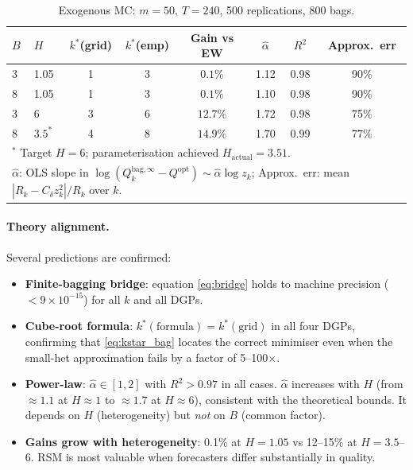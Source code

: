 \documentclass[12pt,a4paper]{article}
\begin{document}
\begin{table}[h]
\centering
\caption{Exogenous MC: $m=50$, $T=240$, 500 replications, 800 bags.}
\label{tab:exo_main}
\begin{tabular}{llcccccc}
\toprule
$B$ & $H$ & $k^*$(grid) & $k^*$(emp) & Gain vs EW
    & $\hat\alpha$ & $R^2$ & Approx.\ err \\
\midrule
3 & 1.05 & 1 & 3 & $0.1\%$ & 1.12 & 0.98 & 90\% \\
8 & 1.05 & 1 & 3 & $0.1\%$ & 1.10 & 0.98 & 90\% \\
3 & 6    & 3 & 6 & $12.7\%$ & 1.72 & 0.98 & 75\% \\
8 & $3.5^*$ & 4 & 8 & $14.9\%$ & 1.70 & 0.99 & 77\% \\
\bottomrule
\multicolumn{8}{l}{\footnotesize $^*$ Target $H=6$; parameterisation achieved $H_{\mathrm{actual}}=3.51$.}\\
\multicolumn{8}{l}{\footnotesize $\hat\alpha$: OLS slope in $\log(Q_k^{\mathrm{bag},\infty}-Q^{\mathrm{opt}}) \sim \hat\alpha\log z_k$;
  Approx.\ err: mean $|R_k - C_\delta z_k^2|/R_k$ over $k$.}
\end{tabular}
\end{table}

\paragraph{Theory alignment.}
Several predictions are confirmed:
\begin{itemize}
\item \textbf{Finite-bagging bridge}: equation \eqref{eq:bridge} holds to
  machine precision ($<9\times10^{-15}$) for all $k$ and all DGPs.
\item \textbf{Cube-root formula}: $k^*(\text{formula}) = k^*(\text{grid})$
  in all four DGPs, confirming that \eqref{eq:kstar_bag} locates the correct
  minimiser even when the small-het approximation fails by a factor of
  5--100$\times$.
\item \textbf{Power-law}: $\hat\alpha \in [1,2]$ with $R^2 > 0.97$ in all
  cases. $\hat\alpha$ increases with $H$ (from $\approx 1.1$ at $H\approx1$
  to $\approx 1.7$ at $H\approx6$), consistent with the theoretical bounds.
  It depends on $H$ (heterogeneity) but \emph{not} on $B$ (common factor).
\item \textbf{Gains grow with heterogeneity}: 0.1\% at $H=1.05$ vs
  12--15\% at $H=3.5$--6. RSM is most valuable when forecasters differ
  substantially in quality.
\end{itemize}
\end{document}

